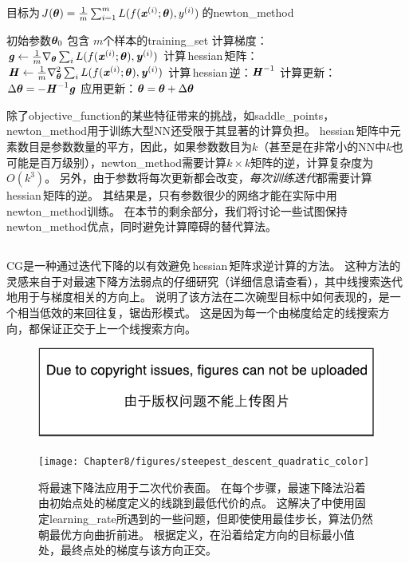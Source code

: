 \begin{algorithm}[ht]
\caption{目标为$J(\boldsymbol{\theta})= \frac{1}{m} \sum_{i=1}^m L(f(\boldsymbol{\mathit{x}}^{(i)};\boldsymbol{\theta}), y^{(i)})$的\gls{newton_method}}
\label{alg:newton}
\begin{algorithmic}
\REQUIRE 初始参数$\boldsymbol{\theta}_{0}$
\REQUIRE 包含 $m$个样本的\gls{training_set}
      \STATE 计算梯度： $\boldsymbol{\mathit{g}} \leftarrow 
     \frac{1}{m} \nabla_{\boldsymbol{\theta}} \sum_i L(f(\boldsymbol{\mathit{x}}^{(i)};\boldsymbol{\theta}),\boldsymbol{\mathit{y}}^{(i)})$ 
      \STATE 计算\,\gls{hessian}\,矩阵：$\boldsymbol{\mathit{H}} \leftarrow  
     \frac{1}{m} \nabla_{\boldsymbol{\theta}}^2 \sum_i L(f(\boldsymbol{\mathit{x}}^{(i)};\boldsymbol{\theta}),\boldsymbol{\mathit{y}}^{(i)})$ 
    \STATE 计算\,\gls{hessian}\,逆：$\boldsymbol{\mathit{H}}^{-1}$
    \STATE 计算更新： $\Delta \boldsymbol{\theta} = - \boldsymbol{\mathit{H}}^{-1} \boldsymbol{\mathit{g}}$
    \STATE 应用更新：$\boldsymbol{\theta} = \boldsymbol{\theta}+\Delta \boldsymbol{\theta}$
\ENDWHILE
\end{algorithmic}
\end{algorithm}


除了\gls{objective_function}的某些特征带来的挑战，如\gls{saddle_points}，\gls{newton_method}用于训练大型\gls{NN}还受限于其显著的计算负担。
\gls{hessian}\,矩阵中元素数目是参数数量的平方，因此，如果参数数目为$k$（甚至是在非常小的\gls{NN}中$k$也可能是百万级别），\gls{newton_method}需要计算$k\times k$矩阵的逆，计算复杂度为$O(k^3)$。
另外，由于参数将每次更新都会改变，\emph{每次训练迭代}都需要计算\,\gls{hessian}\,矩阵的逆。
其结果是，只有参数很少的网络才能在实际中用\gls{newton_method}训练。
在本节的剩余部分，我们将讨论一些试图保持\gls{newton_method}优点，同时避免计算障碍的替代算法。

\subsection{}
\label{sec:conjugate_gradients}
\gls{CG}是一种通过迭代下降的以有效避免\,\gls{hessian}\,矩阵求逆计算的方法。
这种方法的灵感来自于对最速下降方法弱点的仔细研究（详细信息请查看），其中线搜索迭代地用于与梯度相关的方向上。
说明了该方法在二次碗型目标中如何表现的，是一个相当低效的来回往复，锯齿形模式。
这是因为每一个由梯度给定的线搜索方向，都保证正交于上一个线搜索方向。

\begin{figure}[!htb]
\ifOpenSource
\centerline{\includegraphics{figure.pdf}}
\else
\centerline{\texttt{[image: Chapter8/figures/steepest\_descent\_quadratic\_color]}}
\fi
\caption{将最速下降法应用于二次代价表面。
在每个步骤，最速下降法沿着由初始点处的梯度定义的线跳到最低代价的点。
这解决了中使用固定\gls{learning_rate}所遇到的一些问题，但即使使用最佳步长，算法仍然朝最优方向曲折前进。
根据定义，在沿着给定方向的目标最小值处，最终点处的梯度与该方向正交。
}
\label{fig:chap8_steepest_descent_quadratic}
\end{figure}


